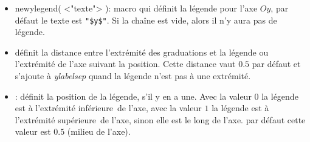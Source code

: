 \begin{itemize}
\begin{itemize}
  \item \textcolor{\coloropt}{newylegend( <"texte"> )}: macro qui définit la légende pour l'axe $Oy$, par défaut le texte est \verb|"$y$"|. Si la chaîne est vide, alors il n'y aura pas de légende.
  \item {} définit la distance entre l'extrémité des graduations et la légende ou l'extrémité de l'axe suivant la position. Cette distance vaut $0.5$ par défaut et s'ajoute à \textit{ylabelsep} quand la légende n'est pas à une extrémité.
  \item {}: définit la position de la légende, s'il y en a une. Avec la valeur $0$ la légende est à l'extrémité \og inférieure\fg\ de l'axe, avec la valeur $1$ la légende est à l'extrémité \og supérieure\fg\ de l'axe, sinon elle est le long de l'axe. par défaut cette valeur est $0.5$ (milieu de l'axe).
  \end{itemize}
\end{itemize}

